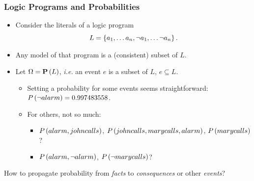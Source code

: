 \documentclass[bigger]{beamer}
\begin{document}
\begin{frame}
    \frametitle{Logic Programs and Probabilities}
    \vfill
    \begin{itemize}
        \item Consider the literals of a logic program $$L = \set{a_1, \ldots a_n, \neg a_1, \ldots \neg a_n}.$$
        \item Any model of that program is a (consistent) subset of $L$.
        \item Let $\Omega = \mathbf{P}\del{L}$, \emph{i.e.} an \alert{event} $e$ is a subset of $L$, $e \subseteq L$.
              \begin{itemize}
                  \item Setting a probability for some events seems straightforward: $P\del{\neg alarm} = 0.997483558$.
                  \item For others, not so much:
                        \begin{itemize}
                            \item $P\del{alarm, johncalls}$, $P\del{johncalls, marycalls, alarm}$, $P\del{marycalls}$?
                            \item $P\del{alarm, \neg alarm}$, $P\del{\neg marycalls}$?
                        \end{itemize}
              \end{itemize}
    \end{itemize}
    \vfill
    \begin{center}
        How to \alert{propagate} probability from \emph{facts} to \emph{consequences} or other \emph{events}?
    \end{center}
\end{frame}
%
\end{document}
